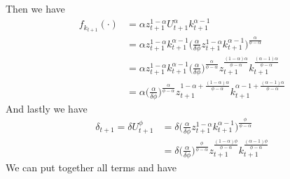 \documentclass[a4paper]{article}
\theoremstyle{definition}
\begin{document}
Then we have
	\begin{align*}
	f_{k_{t+1}}(\cdot)	&= \alpha z_{t+1}^{1-\alpha}U_{t+1}^{\alpha}k_{t+1}^{\alpha-1} \\
							&= \alpha z_{t+1}^{1-\alpha} k_{t+1}^{\alpha-1} \Big( \frac{\alpha}{\delta\phi}z_{t+1}^{1-\alpha}k_{t+1}^{\alpha-1} \Big)^{\frac{\alpha}{\phi-\alpha}} \\
							&= \alpha z_{t+1}^{1-\alpha} k_{t+1}^{\alpha-1} \Big( \frac{\alpha}{\delta\phi} \Big)^{\frac{\alpha}{\phi-\alpha}}z_{t+1}^{\frac{(1-\alpha)\alpha}{\phi-\alpha}}k_{t+1}^{\frac{(\alpha-1)\alpha}{\phi-\alpha}}  \\
							&= \alpha \Big( \frac{\alpha}{\delta\phi} \Big)^{\frac{\alpha}{\phi-\alpha}} z_{t+1}^{1-\alpha+\frac{(1-\alpha)\alpha}{\phi-\alpha}}k_{t+1}^{\alpha-1+\frac{(\alpha-1)\alpha}{\phi-\alpha}}
	\end{align*}	
And lastly we have
	\begin{align*}
	\delta_{t+1}=\delta U_{t+1}^{\phi} 	&= \delta \Big( \frac{\alpha}{\delta\phi}z_{t+1}^{1-\alpha}k_{t+1}^{\alpha-1} \Big)^{\frac{\phi}{\phi-\alpha}} \\
												&= \delta \Big( \frac{\alpha}{\delta\phi} \Big)^{\frac{\phi}{\phi-\alpha}}z_{t+1}^{\frac{(1-\alpha)\phi}{\phi-\alpha}}k_{t+1}^{\frac{(\alpha-1)\phi}{\phi-\alpha}}
	\end{align*}
We can put together all terms and have
\end{document}

